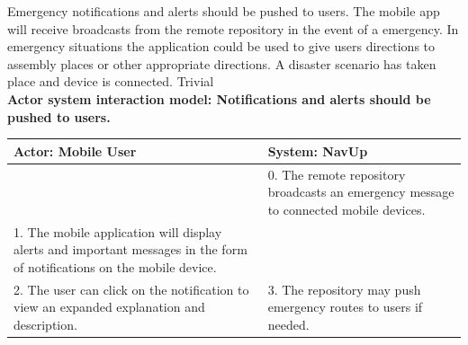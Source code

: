 \FuncReq
{Emergency notifications and alerts should be pushed to users.}
{The mobile app will receive broadcasts from the remote repository in the event of a emergency. In emergency situations the application could be used to give users directions to assembly places or other appropriate directions.}
{A disaster scenario has taken place and device is connected.}
{Trivial}
    \\
    \textbf{Actor system interaction model: Notifications and alerts should be pushed to users. }\\
    \begin{tabular}{ | p{6cm} | p{6cm} |}
    \hline
    Actor: Mobile User & System: NavUp \\ \hline
    & 0. The remote repository broadcasts an emergency message to connected mobile devices. \\ \hline
    1. The mobile application will display alerts and important messages in the form of notifications on the mobile device. & \\ \hline
    2. The user can click on the notification to view an expanded explanation and description. & 3. The repository may push emergency routes to users if needed.\\ \hline
    
    \end{tabular}
\\
\bigskip
